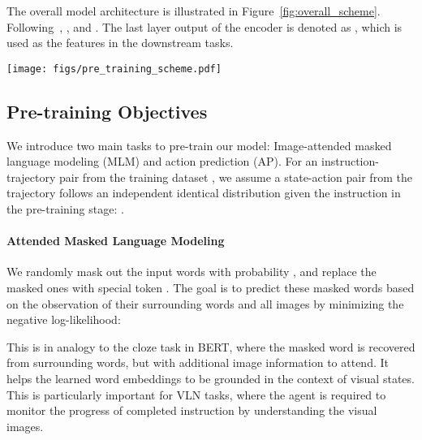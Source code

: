 \documentclass[10pt,twocolumn,letterpaper]{article}
\begin{document}
The overall model architecture is illustrated in Figure~\ref{fig:overall_scheme}. Following~\cite{tan2019lxmert}, ,   and . The last layer output of the encoder is denoted as , which is used as the features in the downstream tasks.


\begin{figure*}[t!]\vspace{-0mm}\centering
	\texttt{[image: figs/pre\_training\_scheme.pdf]}  
	\vspace{-0mm}
	\caption{Illustration of the proposed pre-training model. In this example, two learning objectives are considered: () image-attended masked language modeling is performed on the masked word  in the instruction; () action prediction is performed to make the decision to navigate toward direction . Only the language features are used for fine-tuning in downstream tasks.}
	\vspace{-4mm}
	\label{fig:overall_scheme}
\end{figure*}



\subsection{Pre-training Objectives}

We introduce two main tasks to pre-train our model: Image-attended masked language modeling (MLM) and action prediction (AP). For an instruction-trajectory pair  from the training dataset , we assume a state-action pair from the trajectory follows an independent identical distribution given the instruction in the pre-training stage: .

\paragraph{Attended Masked Language Modeling} 
We randomly mask out the input words with probability , and replace the masked ones  with special token
 . The goal is to predict these masked words based on the observation of their surrounding
words  and all images  by minimizing the negative log-likelihood:

This is in analogy to the cloze task in BERT, where the masked word is recovered from surrounding words, but with additional image information to attend. It helps the learned word embeddings to be grounded in the context of visual states. This is particularly important for VLN tasks, where the agent is required to monitor the progress of completed instruction by understanding the visual images.
\end{document}
